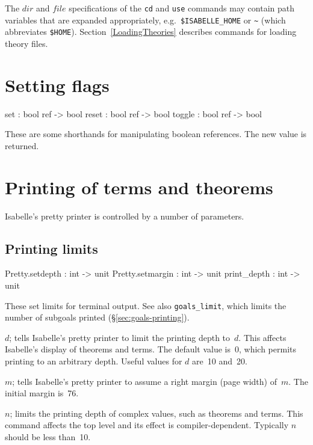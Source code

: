 The $dir$ and $file$ specifications of the \texttt{cd} and
\texttt{use} commands may contain path variables that are expanded
appropriately, e.g.\ \texttt{\$ISABELLE_HOME} or \texttt{\~\relax}
(which abbreviates \texttt{\$HOME}).  Section~\ref{LoadingTheories}
describes commands for loading theory files.


\section{Setting flags}
\begin{ttbox}
set     : bool ref -> bool
reset   : bool ref -> bool
toggle  : bool ref -> bool
\end{ttbox}
These are some shorthands for manipulating boolean references.  The new
value is returned.


\section{Printing of terms and theorems}\label{sec:printing-control}
Isabelle's pretty printer is controlled by a number of parameters.

\subsection{Printing limits}
\begin{ttbox} 
Pretty.setdepth  : int -> unit
Pretty.setmargin : int -> unit
print_depth      : int -> unit
\end{ttbox}
These set limits for terminal output.  See also {\tt goals_limit},
which limits the number of subgoals printed
(\S\ref{sec:goals-printing}).

\begin{ttdescription}
\item[\ttindexbold{Pretty.setdepth} \(d\);]  
  tells Isabelle's pretty printer to limit the printing depth to~$d$.  This
  affects Isabelle's display of theorems and terms.  The default value
  is~0, which permits printing to an arbitrary depth.  Useful values for
  $d$ are~10 and~20.

\item[\ttindexbold{Pretty.setmargin} \(m\);]  
  tells Isabelle's pretty printer to assume a right margin (page width)
  of~$m$.  The initial margin is~76.

\item[\ttindexbold{print_depth} \(n\);]  
  limits the printing depth of complex \ML{} values, such as theorems and
  terms.  This command affects the \ML{} top level and its effect is
  compiler-dependent.  Typically $n$ should be less than~10.
\end{ttdescription}


